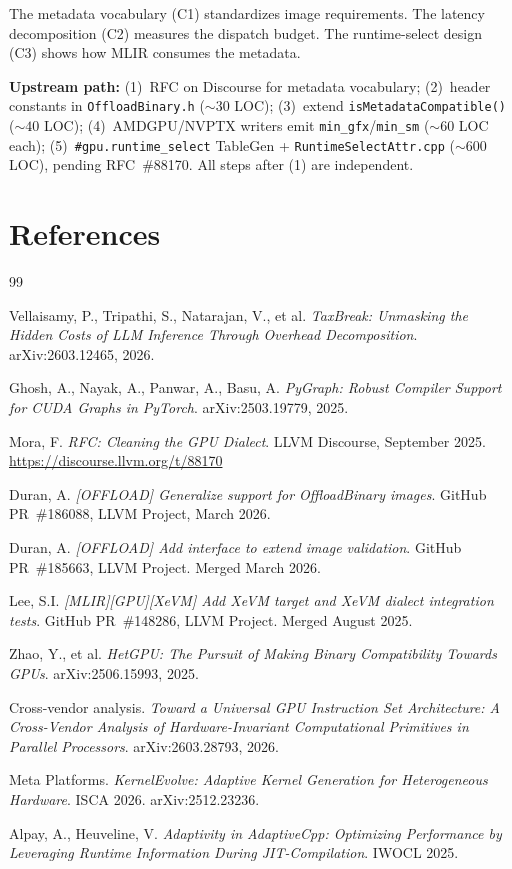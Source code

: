 \documentclass[10pt]{article}
\begin{document}
The metadata vocabulary (C1) standardizes image requirements.
The latency decomposition (C2) measures the dispatch budget.
The runtime-select design (C3) shows how MLIR consumes the metadata.

\textbf{Upstream path:}
(1)~RFC on Discourse for metadata vocabulary;
(2)~header constants in \texttt{OffloadBinary.h} (${\sim}30$ LOC);
(3)~extend \texttt{isMetadataCompatible()} (${\sim}40$ LOC);
(4)~AMDGPU/NVPTX writers emit \texttt{min\_gfx}/\texttt{min\_sm} (${\sim}60$ LOC each);
(5)~\texttt{\#gpu.runtime\_select} TableGen + \texttt{RuntimeSelectAttr.cpp} (${\sim}600$ LOC), pending RFC~\#88170.
All steps after (1) are independent.

\section*{References}


\begin{thebibliography}{99}

Vellaisamy, P., Tripathi, S., Natarajan, V., et al.
\emph{TaxBreak: Unmasking the Hidden Costs of LLM Inference Through Overhead Decomposition}.
arXiv:2603.12465, 2026.

Ghosh, A., Nayak, A., Panwar, A., Basu, A.
\emph{PyGraph: Robust Compiler Support for CUDA Graphs in PyTorch}.
arXiv:2503.19779, 2025.

Mora, F.
\emph{RFC: Cleaning the GPU Dialect}.
LLVM Discourse, September 2025.
\url{https://discourse.llvm.org/t/88170}

Duran, A.
\emph{[OFFLOAD] Generalize support for OffloadBinary images}.
GitHub PR~\#186088, LLVM Project, March 2026.

Duran, A.
\emph{[OFFLOAD] Add interface to extend image validation}.
GitHub PR~\#185663, LLVM Project. Merged March 2026.

Lee, S.I.
\emph{[MLIR][GPU][XeVM] Add XeVM target and XeVM dialect integration tests}.
GitHub PR~\#148286, LLVM Project. Merged August 2025.

Zhao, Y., et al.
\emph{HetGPU: The Pursuit of Making Binary Compatibility Towards GPUs}.
arXiv:2506.15993, 2025.

Cross-vendor analysis.
\emph{Toward a Universal GPU Instruction Set Architecture: A Cross-Vendor Analysis of Hardware-Invariant Computational Primitives in Parallel Processors}.
arXiv:2603.28793, 2026.

Meta Platforms.
\emph{KernelEvolve: Adaptive Kernel Generation for Heterogeneous Hardware}.
ISCA 2026. arXiv:2512.23236.

Alpay, A., Heuveline, V.
\emph{Adaptivity in AdaptiveCpp: Optimizing Performance by Leveraging Runtime Information During JIT-Compilation}.
IWOCL 2025.

\end{thebibliography}
\end{document}
